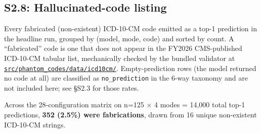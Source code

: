 \subsection{S2.8: Hallucinated-code listing}\label{s2.8-hallucinated-code-listing}

Every fabricated (non-existent) ICD-10-CM code emitted as a top-1
prediction in the headline run, grouped by (model, mode, code) and
sorted by count. A ``fabricated'' code is one that does not appear in
the FY2026 CMS-published ICD-10-CM tabular list, mechanically
checked by the bundled validator at
\href{https://github.com/ufbfung/phantom-codes/tree/main/src/phantom_codes/data/icd10cm/}{\texttt{src/phantom\_codes/data/icd10cm/}}.
Empty-prediction rows (the model returned no code at all) are
classified as \texttt{no\_prediction} in the 6-way taxonomy and are not
included here; see §S2.3 for those rates.

Across the 28-configuration matrix on n=125 × 4 modes = 14,000
total top-1 predictions, \textbf{352 (2.5\%) were fabrications}, drawn
from 16 unique non-existent ICD-10-CM strings.

